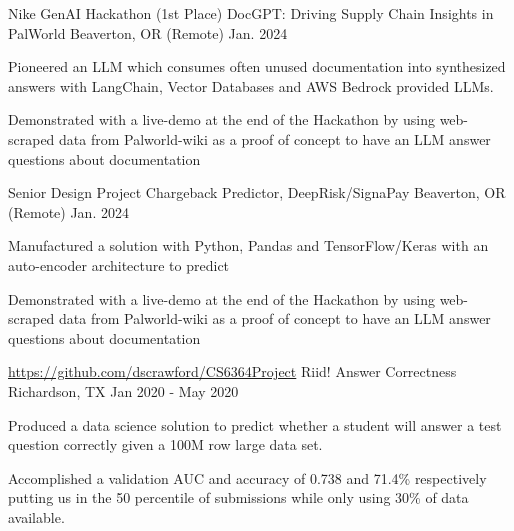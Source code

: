 


\begin{cventries}


\cventry
{Nike GenAI Hackathon} %
{(1st Place) DocGPT: Driving Supply Chain Insights in PalWorld} %
{Beaverton, OR (Remote)} %
{Jan. 2024} %
{ %
\begin{cvitems}
\item {Pioneered an LLM which consumes often unused documentation into synthesized answers with LangChain, Vector Databases and AWS Bedrock provided LLMs.}
\item {Demonstrated with a live-demo at the end of the Hackathon by using web-scraped data from Palworld-wiki as a proof of concept to have an LLM answer questions about documentation}
\end{cvitems}
}


\cventry
{Senior Design Project} %
{Chargeback Predictor, DeepRisk/SignaPay} %
{Beaverton, OR (Remote)} %
{Jan. 2024} %
{ %
\begin{cvitems}
\item {Manufactured a solution with Python, Pandas and TensorFlow/Keras with an auto-encoder architecture to predict}
\item {Demonstrated with a live-demo at the end of the Hackathon by using web-scraped data from Palworld-wiki as a proof of concept to have an LLM answer questions about documentation}
\end{cvitems}
}

\cventry
{\url{https://github.com/dscrawford/CS6364Project}} %
{Riid! Answer Correctness} %
{Richardson, TX} %
{Jan 2020 - May 2020} %
{ %
\begin{cvitems}
\item {
Produced a data science solution to predict whether a student will answer a test question correctly given a 100M row large data set.
}
\item { 
Accomplished a validation AUC and accuracy of 0.738 and 71.4\% respectively putting us in the 50 percentile of submissions while only using 30\% of data available. 
}
\end{cvitems}
}

\end{cventries}